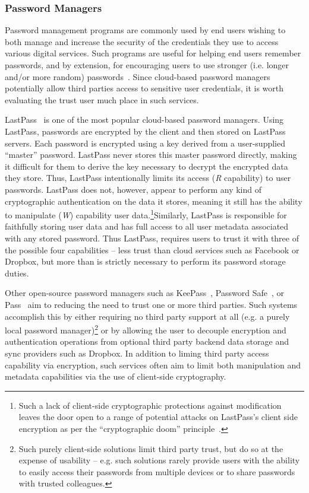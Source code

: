 \subsubsection{Password Managers}

Password management programs are commonly used by end users wishing to
both manage and increase the security of the credentials they use to
access various digital services. Such programs are useful for helping
end users remember passwords, and by extension, for encouraging users
to use stronger (i.e. longer and/or more random)
passwords~\cite{brodkin-passman, krebs-passwords,
  schneier-passwords}. Since cloud-based password managers potentially
allow third parties access to sensitive user credentials, it is worth
evaluating the trust user much place in such services.

LastPass~\cite{lastpass} is one of the most popular cloud-based
password managers. Using LastPass, passwords are encrypted by the
client and then stored on LastPass servers. Each password is encrypted
using a key derived from a user-supplied ``master'' password. LastPass
never stores this master password directly, making it difficult for
them to derive the key necessary to decrypt the encrypted data they
store. Thus, LastPass intentionally limits its access (\emph{R}
capability) to user passwords. LastPass does not, however, appear to
perform any kind of cryptographic authentication on the data it
stores, meaning it still has the ability to manipulate (\emph{W})
capability user data.\footnote{Such a lack of client-side
  cryptographic protections against modification leaves the door open
  to a range of potential attacks on LastPass's client side encryption
  as per the ``cryptographic doom''
  principle~\cite{marlinspike-doom}.}Similarly, LastPass is
responsible for faithfully storing user data and has full access to
all user metadata associated with any stored password. Thus LastPass,
requires users to trust it with three of the possible four
capabilities -- less trust than cloud services such as Facebook or
Dropbox, but more than is strictly necessary to perform its password
storage duties.

Other open-source password managers such as KeePass~\cite{keepass},
Password Safe~\cite{passwordsafe}, or Pass~\cite{pass} aim to reducing
the need to trust one or more third parties. Such systems accomplish
this by either requiring no third party support at all (e.g. a purely
local password manager)\footnote{Such purely client-side solutions
  limit third party trust, but do so at the expense of usability --
  e.g. such solutions rarely provide users with the ability to easily
  access their passwords from multiple devices or to share passwords
  with trusted colleagues.} or by allowing the user to decouple
encryption and authentication operations from optional third party
backend data storage and sync providers such as Dropbox. In addition
to liming third party access capability via encryption, such services
often aim to limit both manipulation and metadata capabilities via the
use of client-side cryptography.

